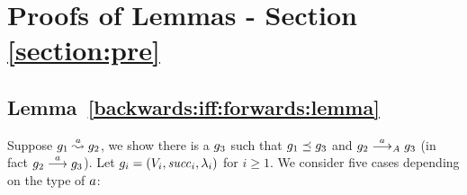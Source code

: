 \section{Proofs of Lemmas - Section \ref{section:pre}}



\subsection*{Lemma~\ref{backwards:iff:forwards:lemma}}

Suppose $g_1\stackrel{a}{\leadsto}g_2$, 
we show there is
a $g_3$ such that $g_1\preceq g_3$ and
$g_2\stackrel{a}{\longrightarrow}_Ag_3$ 
(in fact $g_2\stackrel{a}{\longrightarrow}g_3$).
%
Let $g_i=\left(V_i,{\it succ}_i,\lambda_i\right)$
for $i\geq 1$.
%
We consider five cases depending on the type of $a$:
